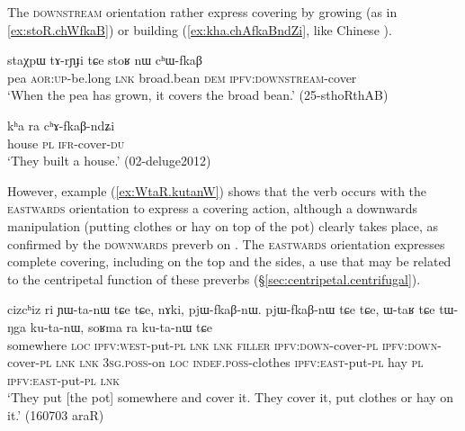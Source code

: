 The \textsc{downstream} orientation rather express covering by growing (as in \ref{ex:stoR.chWfkaB}) or building (\ref{ex:kha.chAfkaBndZi}, like Chinese ).

\begin{exe}
\ex \label{ex:stoR.chWfkaB}
\gll staχpɯ tɤ-rɲɟi tɕe stoʁ nɯ cʰɯ-fkaβ\\
pea \textsc{aor}:\textsc{up}-be.long \textsc{lnk} broad.bean \textsc{dem} \textsc{ipfv}:\textsc{downstream}-cover\\
\glt `When the pea has grown, it covers the broad bean.' (25-sthoRthAB)
\end{exe}

\begin{exe}
\ex \label{ex:kha.chAfkaBndZi}
\gll kʰa ra cʰɤ-fkaβ-ndʑi  \\
house \textsc{pl} \textsc{ifr}-cover-\textsc{du}   \\
\glt `They built a house.' (02-deluge2012) 
\end{exe}

However, example (\ref{ex:WtaR.kutanW}) shows that the verb  occurs with the \textsc{eastwards} orientation to express a covering action, although a downwards manipulation (putting clothes or hay on top of the pot) clearly takes place, as confirmed by the \textsc{downwards} preverb on . The \textsc{eastwards} orientation expresses complete covering, including on the top and the sides, a use that may be related to the centripetal function of these preverbs (§\ref{sec:centripetal.centrifugal}). 

\begin{exe}
\ex \label{ex:WtaR.kutanW}
\gll  cizcʰiz ri ɲɯ-ta-nɯ tɕe tɕe, nɤki, pjɯ-fkaβ-nɯ. pjɯ-fkaβ-nɯ tɕe tɕe, ɯ-taʁ tɕe tɯ-ŋga ku-ta-nɯ, soʁma ra ku-ta-nɯ tɕe \\
somewhere \textsc{loc} \textsc{ipfv}:\textsc{west}-put-\textsc{pl} \textsc{lnk} \textsc{lnk} \textsc{filler} \textsc{ipfv}:\textsc{down}-cover-\textsc{pl} \textsc{ipfv}:\textsc{down}-cover-\textsc{pl} \textsc{lnk} \textsc{lnk} \textsc{3sg}.\textsc{poss}-on \textsc{loc} \textsc{indef}.\textsc{poss}-clothes \textsc{ipfv}:\textsc{east}-put-\textsc{pl} hay \textsc{pl} \textsc{ipfv}:\textsc{east}-put-\textsc{pl} \textsc{lnk} \\
\glt `They put [the pot] somewhere and cover it. They cover it, put clothes or hay on it.' (160703 araR)
\end{exe}

